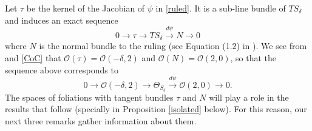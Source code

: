 \documentclass{amsart} %
\theoremstyle{definition}
\newcommand{\mcO}{\mathcal{O}}
\begin{document}
Let $\tau $ be the kernel of the Jacobian of $\psi$ in \eqref{ruled}. It is a sub-line bundle of $TS_{\delta}$
and induces an exact sequence
\begin{equation*}
0\rightarrow \tau \rightarrow  TS_{\delta}\xrightarrow{d\psi} N\rightarrow 0
\end{equation*}
where $ N $ is the normal bundle to the ruling (see Equation (1.2) in \cite{Gomez-Mont}).
We see from \cite[Lemma 1.4]{Gomez-Mont} and \eqref{CoC} that
$ \mcO( \tau ) = \mcO(-\delta,2) $ and $ \mcO( N ) = \mcO(2,0) $, so that
the sequence above corresponds to
\begin{equation}\label{exact}
0\rightarrow \mcO(-\delta,2) \rightarrow
 \Theta_{S_{\delta}}\xrightarrow{d\psi} \mcO(2,0) \rightarrow 0.
\end{equation}
The spaces of foliations with tangent bundles $ \tau $ and $ N $ will play a role in the results that follow (specially in Proposition \ref{isolated} below). For this reason, our next three remarks gather information about them.
\end{document}
